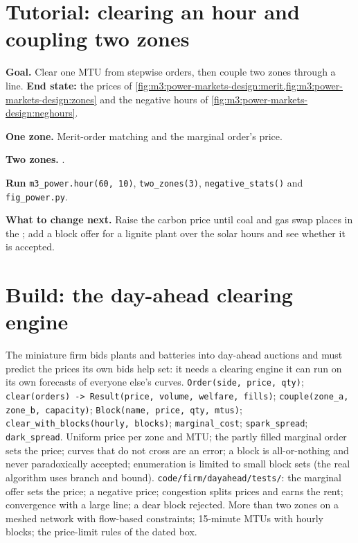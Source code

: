 \section{Tutorial: clearing an hour and coupling two zones}\label{tut:m3:power-markets-design:clear}

\begin{tutorial}
\textbf{Goal.} Clear one MTU from stepwise orders, then couple two zones through a line.
\textbf{End state:} the prices of \cref{fig:m3:power-markets-design:merit,fig:m3:power-markets-design:zones}
and the negative hours of \cref{fig:m3:power-markets-design:neghours}.
\begin{tutsteps}
\item \textbf{One zone.} Merit-order matching and the marginal order's price.
\label{lst:m3:power-markets-design:clear}
\item \textbf{Two zones.} .
\label{lst:m3:power-markets-design:couple}
\item \textbf{Run} \texttt{m3\_power.hour(60, 10)}, \texttt{two\_zones(3)},
\texttt{negative\_stats()} and \texttt{fig\_power.py}.
\end{tutsteps}
\textbf{What to change next.} Raise the carbon price until coal and gas swap places in the
; add a block offer for a lignite plant over the solar hours and see whether it
is accepted.
\end{tutorial}

\section{Build: the day-ahead clearing engine}\label{bld:m3:power-markets-design:dayahead}

\begin{build}
 The miniature firm bids plants and batteries into day-ahead auctions and
must predict the prices its own bids help set: it needs a clearing engine it can run on its
own forecasts of everyone else's curves.
 \texttt{Order(side, price, qty)}; \texttt{clear(orders) -> Result(price,
volume, welfare, fills)}; \texttt{couple(zone\_a, zone\_b, capacity)};
\texttt{Block(name, price, qty, mtus)}; \texttt{clear\_with\_blocks(hourly, blocks)};
\texttt{marginal\_cost}; \texttt{spark\_spread}; \texttt{dark\_spread}.
 Uniform price per zone and MTU; the partly filled marginal order sets the
price; curves that do not cross are an error; a block is all-or-nothing and never
paradoxically accepted; enumeration is limited to small block sets (the real algorithm
uses branch and bound).
 \texttt{code/firm/dayahead/tests/}: the marginal offer sets the
price; a negative price; congestion splits prices and earns the rent; convergence with a
large line; a dear block rejected.
 More than two zones on a meshed network with flow-based constraints;
15-minute MTUs with hourly blocks; the price-limit rules of the dated box.
\end{build}

